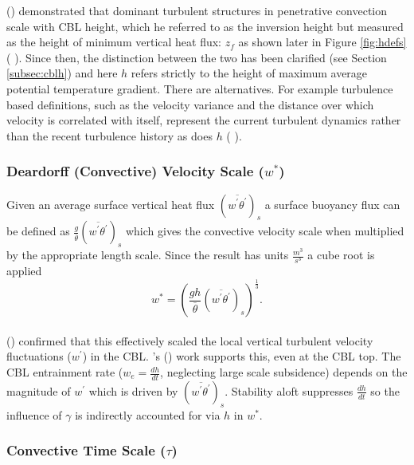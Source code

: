 \citeauthor{Deardorff72} (\citeyear{Deardorff72}) demonstrated that dominant turbulent structures in penetrative convection scale with \acs{CBL} height, which he referred to as the inversion height but measured as the height of minimum vertical heat flux: $z_{f}$ as shown later in Figure \ref{fig:hdefs} (\citeauthor{DearWill80} \citeyear{DearWill80}).  Since then, the distinction between the two has been clarified (see Section \ref{subsec:cblh}) and here $h$ refers strictly to the height of maximum average potential temperature gradient. There are alternatives. For example turbulence based definitions, such as the velocity variance and the distance over which velocity is correlated with itself, represent the current turbulent dynamics rather than the recent turbulence history as does $h$ (\citeauthor{Traum11} \citeyear{Traum11}).\\

\subsubsection{Deardorff (Convective) Velocity Scale ($w^{*}$)}
\label{subsubsec:convel}

Given an average surface vertical heat flux $(\overline{w^{'}\theta^{'}})_{s}$ a surface buoyancy flux can be defined as $\frac{g}{\overline{\theta}}(\overline{w^{'}\theta^{'}})_{s}$ which gives the convective velocity scale when multiplied by the appropriate length scale.  Since the result has units $\frac{m^{3}}{s^{3}}$ a cube root is applied\\

\begin{equation}
w^{*} = \left( \frac{gh}{\overline{\theta}}(\overline{w^{'}\theta^{'}})_{s} \right)^{\frac{1}{3}}.
\end{equation}\\

\citeauthor{Deardorff70} (\citeyear{Deardorff70}) confirmed that this effectively scaled the local vertical turbulent velocity fluctuations ($w^{'}$) in the \acs{CBL}.  \citeauthor{Sorbjan1}'s (\citeyear{Sorbjan1}) work supports this, even at the \acs{CBL} top.  The \acs{CBL} entrainment rate ($w_{e} = \frac{dh}{dt}$, neglecting large scale subsidence) depends on the magnitude of $w^{'}$ which is driven by $(\overline{w^{'}\theta^{'}})_{s}$. Stability aloft suppresses $\frac{dh}{dt}$ so the influence of $\gamma$ is indirectly accounted for via $h$ in $w^{*}$.\\

\subsubsection{Convective Time Scale ($\tau$)}
\label{subsubsec:}

